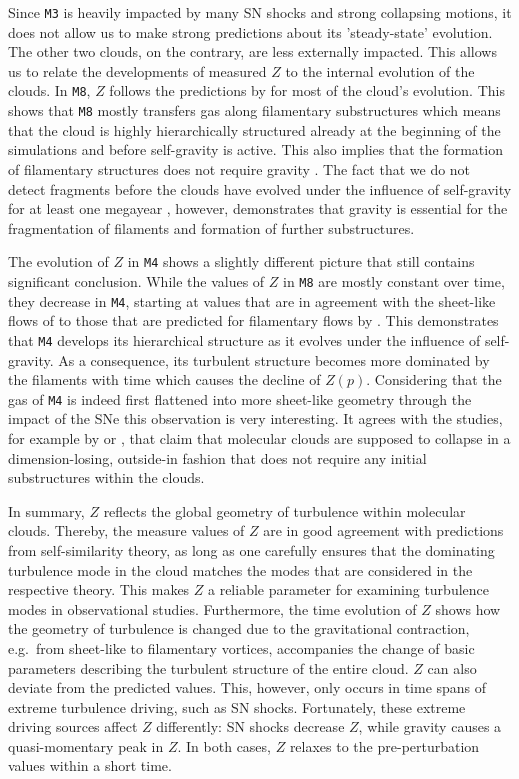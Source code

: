 Since \texttt{M3} is heavily impacted by many SN shocks and strong collapsing motions, it does not allow us to make strong predictions about its 'steady-state' evolution.
The other two clouds, on the contrary, are less externally impacted.
This allows us to relate the developments of measured $Z$ to the internal evolution of the clouds.
In \texttt{M8}, $Z$ follows the predictions by \citet{She1994} for most of the cloud's evolution. 
This shows that \texttt{M8} mostly transfers gas along filamentary substructures which means that the cloud is highly hierarchically structured already at the beginning of the simulations and before self-gravity is active.
This also implies that the formation of filamentary structures does not require gravity \citep[e.g.,][]{Federrath2016}.
The fact that we do not detect fragments before the clouds have evolved under the influence of self-gravity for at least one megayear , however, demonstrates that gravity is essential for the fragmentation of filaments and formation of further substructures.

The evolution of $Z$ in \texttt{M4} shows a slightly different picture that still contains significant conclusion.
While the values of $Z$ in \texttt{M8} are mostly constant over time, they decrease in \texttt{M4}, starting at values that are in agreement with the sheet-like flows of \citet{Boldyrev2002} to those that are predicted for filamentary flows by \citet{She1994}. 
This demonstrates that \texttt{M4} develops its hierarchical structure as it evolves under the influence of self-gravity. 
As a consequence, its turbulent structure becomes more dominated by the filaments with time which causes the decline of $Z(p)$.
Considering that the gas of \texttt{M4} is indeed first flattened into more sheet-like geometry through the impact of the SNe \citep{IbanezMejia2017} this observation is very interesting.
It agrees with the studies, for example by \citet{Lin1965} or \citet{McKee2007}, that claim that molecular clouds are supposed to collapse in a dimension-losing, outside-in fashion that does not require any initial substructures within the clouds.

In summary, $Z$ reflects the global geometry of turbulence within molecular clouds. 
Thereby, the measure values of $Z$ are in good agreement with predictions from self-similarity theory, as long as one carefully ensures that the dominating turbulence mode in the cloud matches the modes that are considered in the respective theory.
This makes $Z$ a reliable parameter for examining turbulence modes in observational studies.
Furthermore, the time evolution of $Z$ shows how the geometry of turbulence is changed due to the gravitational contraction, e.g.~from sheet-like to filamentary vortices, accompanies the change of basic parameters describing the turbulent structure of the entire cloud. 
$Z$ can also deviate from the predicted values. 
This, however, only occurs in time spans of extreme turbulence driving, such as SN shocks.
Fortunately, these extreme driving sources affect $Z$ differently:
SN shocks decrease $Z$, while gravity causes a quasi-momentary peak in $Z$.
In both cases, $Z$ relaxes to the pre-perturbation values within a short time.

